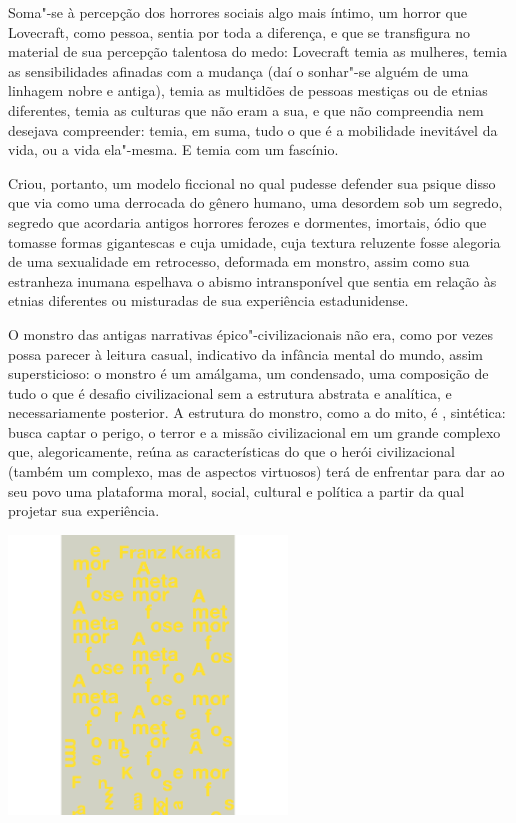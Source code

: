 \begin{multicols}{2}
Soma"-se à percepção dos horrores sociais algo mais íntimo, um horror que Lovecraft, como pessoa, sentia por toda a diferença, e que se
transfigura no material de sua percepção talentosa do medo: Lovecraft
temia as mulheres, temia as sensibilidades afinadas com a mudança (daí o
sonhar"-se alguém de uma linhagem nobre e antiga), temia as multidões de
pessoas mestiças ou de etnias diferentes, temia as culturas que não eram
a sua, e que não compreendia nem desejava compreender: temia, em suma,
tudo o que é a mobilidade inevitável da vida, ou a vida ela"-mesma. E
temia com um fascínio.

Criou, portanto, um modelo ficcional no qual pudesse defender sua psique
disso que via como uma derrocada do gênero humano, uma desordem sob um
segredo, segredo que acordaria antigos horrores ferozes e dormentes,
imortais, ódio que tomasse formas gigantescas e cuja umidade, cuja
textura reluzente fosse alegoria de uma sexualidade em retrocesso,
deformada em monstro, assim como sua
estranheza inumana espelhava o abismo intransponível que sentia em
relação às etnias diferentes ou misturadas de sua experiência
estadunidense.

O monstro das antigas narrativas épico"-civilizacionais não era,
como por vezes possa parecer à leitura casual, indicativo da infância
mental do mundo, assim supersticioso: o monstro é um amálgama, um
condensado, uma composição de tudo o que é desafio civilizacional sem a
estrutura abstrata e analítica, e necessariamente posterior. A estrutura do
monstro, como a do mito, é {}, sintética: busca captar o
perigo, o terror e a missão civilizacional em um grande complexo que,
alegoricamente, reúna as características do que o herói civilizacional
(também um complexo, mas de aspectos virtuosos) terá de enfrentar para
dar ao seu povo uma plataforma moral, social, cultural e política a
partir da qual projetar sua experiência.

\bigskip

\noindent{}\textcolor{gray}{\footnotesize{}}
\end{multicols}


\pagebreak %

\begin{center}
\hspace*{.5cm}\includegraphics[width=74mm]{./grid/kafka.png}
\end{center}

